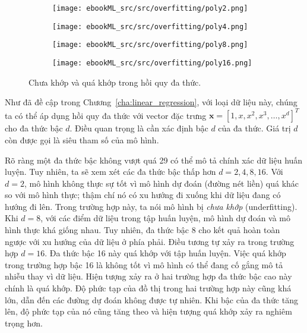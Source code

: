 \begin{figure}[t]
\begin{subfigure}{0.49\textwidth}
\texttt{[image: ebookML\_src/src/overfitting/poly2.png]}
\caption{}
\label{fig:15_polyrega}
\end{subfigure}
\begin{subfigure}{0.49\textwidth}
\texttt{[image: ebookML\_src/src/overfitting/poly4.png]}
\caption{}
\label{fig:15_polyregb}
\end{subfigure}
\begin{subfigure}{0.49\textwidth}
\texttt{[image: ebookML\_src/src/overfitting/poly8.png]}
\caption{}
\label{fig:15_polyregc}
\end{subfigure}
\begin{subfigure}{0.49\textwidth}
\texttt{[image: ebookML\_src/src/overfitting/poly16.png]}
\caption{}
\label{fig:15_polyregd}
\end{subfigure}
\caption{
Chưa khớp và quá khớp trong hồi quy đa thức.
}
\label{fig:15_polyreg}
\end{figure}

Như đã đề cập trong Chương~\ref{cha:linear_regression}, với loại dữ liệu này,
chúng ta có thể áp dụng hồi quy đa thức với vector đặc trưng
$\mathbf{x} = [1, x, x^2, x^3, \dots, x^d]^T$ cho đa thức bậc $d$. Điều quan
trọng là cần xác định bậc $d$ của đa thức. Giá trị $d$ còn được gọi là siêu tham số của mô hình.

Rõ ràng một đa thức bậc không vượt quá 29 có thể mô tả chính xác dữ liệu huấn
luyện. Tuy nhiên, ta sẽ xem xét các đa thức bậc thấp hơn $d = 2, 4, 8, 16$. Với
$d = 2$, mô hình không thực sự tốt vì mô hình dự đoán (đường nét liền) quá khác
so với {mô hình thực}; thậm chí nó có xu hướng đi xuống khi dữ liệu đang
có hướng đi lên. Trong trường hợp này, ta nói mô hình bị \textit{chưa khớp} (underfitting).
Khi $d = 8$, với các điểm dữ liệu trong tập huấn luyện, mô hình dự đoán và mô
hình thực khá giống nhau. Tuy nhiên, đa thức bậc 8 cho kết quả hoàn toàn ngược
với {xu hướng của dữ liệu} ở phía phải. Điều tương tự xảy ra trong trường hợp $d
= 16$. Đa thức bậc 16 này quá khớp với tập huấn luyện. Việc quá khớp
trong trường hợp bậc 16 là không tốt vì mô hình có thể đang cố gắng mô tả
{nhiễu} thay vì dữ liệu. Hiện tượng xảy ra ở hai trường hợp đa thức bậc
cao này chính là quá khớp. Độ phức tạp của đồ thị trong hai
trường hợp này cũng khá lớn, dẫn đến các đường dự đoán không được tự nhiên. Khi bậc của đa thức tăng lên, độ phức tạp của nó cũng tăng theo và hiện tượng quá khớp xảy ra nghiêm trọng hơn.


